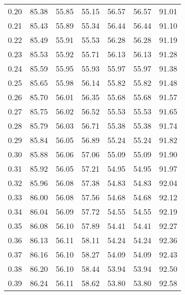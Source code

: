 \begin{tabular}{|c|c|c|c|c|c|c|}
      0.20 &     85.38 &     55.85 &      55.15 &   56.57 &      56.57 &         91.01 \\
      0.21 &     85.43 &     55.89 &      55.34 &   56.44 &      56.44 &         91.10 \\
      0.22 &     85.49 &     55.91 &      55.53 &   56.28 &      56.28 &         91.19 \\
      0.23 &     85.53 &     55.92 &      55.71 &   56.13 &      56.13 &         91.28 \\
      0.24 &     85.59 &     55.95 &      55.93 &   55.97 &      55.97 &         91.38 \\
      0.25 &     85.65 &     55.98 &      56.14 &   55.82 &      55.82 &         91.48 \\
      0.26 &     85.70 &     56.01 &      56.35 &   55.68 &      55.68 &         91.57 \\
      0.27 &     85.75 &     56.02 &      56.52 &   55.53 &      55.53 &         91.65 \\
      0.28 &     85.79 &     56.03 &      56.71 &   55.38 &      55.38 &         91.74 \\
      0.29 &     85.84 &     56.05 &      56.89 &   55.24 &      55.24 &         91.82 \\
      0.30 &     85.88 &     56.06 &      57.06 &   55.09 &      55.09 &         91.90 \\
      0.31 &     85.92 &     56.05 &      57.21 &   54.95 &      54.95 &         91.97 \\
      0.32 &     85.96 &     56.08 &      57.38 &   54.83 &      54.83 &         92.04 \\
      0.33 &     86.00 &     56.08 &      57.56 &   54.68 &      54.68 &         92.12 \\
      0.34 &     86.04 &     56.09 &      57.72 &   54.55 &      54.55 &         92.19 \\
      0.35 &     86.08 &     56.10 &      57.89 &   54.41 &      54.41 &         92.27 \\
      0.36 &     86.13 &     56.11 &      58.11 &   54.24 &      54.24 &         92.36 \\
      0.37 &     86.16 &     56.10 &      58.27 &   54.09 &      54.09 &         92.43 \\
      0.38 &     86.20 &     56.10 &      58.44 &   53.94 &      53.94 &         92.50 \\
      0.39 &     86.24 &     56.11 &      58.62 &   53.80 &      53.80 &         92.58 \\

\end{tabular}
